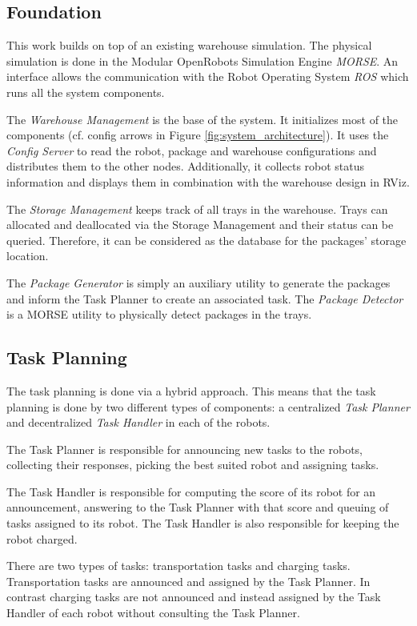 \documentclass[journal]{IEEEtran}
\begin{document}
\subsection{Foundation}
\label{subsec:foundation}
This work builds on top of an existing warehouse simulation. The physical simulation is done in the Modular OpenRobots Simulation Engine \emph{MORSE}. An interface allows the communication with the Robot Operating System \emph{ROS} which runs all the system components.

The \emph{Warehouse Management} is the base of the system. It initializes most of the components (cf. config arrows in Figure \ref{fig:system_architecture}). It uses the \emph{Config Server} to read the robot, package and warehouse configurations and distributes them to the other nodes. Additionally, it collects robot status information and displays them in combination with the warehouse design in RViz.

The \emph{Storage Management} keeps track of all trays in the warehouse. Trays can allocated and deallocated via the Storage Management and their status can be queried. Therefore, it can be considered as the database for the packages' storage location. 

The \emph{Package Generator} is simply an auxiliary utility to generate the packages and inform the Task Planner to create an associated task. The \emph{Package Detector} is a MORSE utility to physically detect packages in the trays.


\subsection{Task Planning}
\label{subsec:task_planning}
The task planning is done via a hybrid approach. This means that the task planning is done by two different types of components: a centralized \textit{Task Planner} and decentralized \textit{Task Handler} in each of the robots.

The Task Planner is responsible for announcing new tasks to the robots, collecting their responses, picking the best suited robot and assigning tasks.

The Task Handler is responsible for computing the score of its robot for an announcement, answering to the Task Planner with that score and queuing of tasks assigned to its robot. The Task Handler is also responsible for keeping the robot charged.

There are two types of tasks: transportation tasks and charging tasks. Transportation tasks are announced and assigned by the Task Planner. In contrast charging tasks are not announced and instead assigned by the Task Handler of each robot without consulting the Task Planner.
\end{document}
